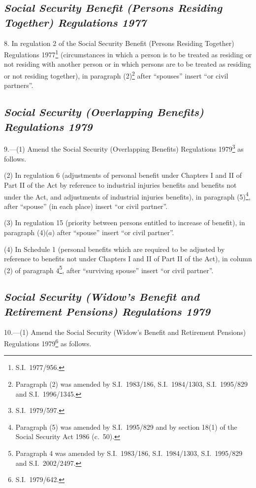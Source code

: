 \documentclass[12pt,a4paper]{article}
\begin{document}
\subsection*{\itshape Social Security Benefit (Persons Residing Together) Regulations 1977}

8.  In regulation 2 of the Social Security Benefit (Persons Residing Together) Regulations 1977\footnote{S.I.\ 1977/956.} (circumstances in which a person is to be treated as residing or not residing with another person or in which persons are to be treated as residing or not residing together), in paragraph (2)\footnote{Paragraph (2) was amended by S.I.\ 1983/186, S.I.\ 1984/1303, S.I.\ 1995/829 and S.I.\ 1996/1345.} after “spouses” insert “or civil partners”.

\subsection*{\itshape\sloppy Social Security (Overlapping Benefits) Regulations 1979}

9.---(1)  Amend the Social Security (Overlapping Benefits) Regulations 1979\footnote{S.I.\ 1979/597.} as follows.

(2) In regulation 6 (adjustments of personal benefit under Chapters I and II of Part II of the Act by reference to industrial injuries benefits and benefits not under the Act, and adjustments of industrial injuries benefits), in paragraph (5)\footnote{Paragraph (5) was amended by S.I.\ 1995/829 and by section 18(1) of the Social Security Act 1986 (c.\ 50).}, after “spouse” (in each place) insert “or civil partner”.

(3) In regulation 15 (priority between persons entitled to increase of benefit), in paragraph (4)($a$)  after “spouse” insert “or civil partner”.

(4) In Schedule 1 (personal benefits which are required to be adjusted by reference to benefits not under Chapters I and II of Part II of the Act), in column (2) of paragraph 4\footnote{Paragraph 4 was amended by S.I.\ 1983/186, S.I.\ 1984/1303, S.I.\ 1995/829 and S.I.\ 2002/2497.}, after “surviving spouse” insert “or civil partner”.

\subsection*{\itshape Social Security (Widow’s Benefit and Retirement Pensions) Regulations 1979}

10.---(1)  Amend the Social Security (Widow’s Benefit and Retirement Pensions) Regulations 1979\footnote{S.I.\ 1979/642.} as follows.
\end{document}
